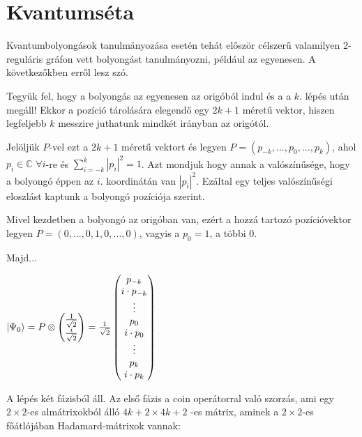 \chapter{\textbf{Kvantumséta}}

Kvantumbolyongások tanulmányozása esetén tehát először célszerű valamilyen
2-reguláris gráfon vett bolyongást tanulmányozni, például az egyenesen. A
következőkben erről lesz szó.

Tegyük fel, hogy a bolyongás az egyenesen az origóból indul és a a $k.$ lépés
után megáll! Ekkor a pozíció tárolására elegendő egy $2k+1$ méretű vektor,
hiszen legfeljebb $k$ messzire juthatunk mindkét irányban az origótól.

Jelöljük $P$-vel ezt a $2k+1$ méretű vektort és legyen
$P=(p_{-k},...,p_0,...,p_{k})$, ahol $p_i\in\mathds{C}$ $\forall i$-re és
$\sum\limits_{i=-k}^{k}|p_i|^2 = 1$. Azt mondjuk hogy annak a valószínűsége,
hogy a bolyongó éppen az $i.$ koordinátán van $|p_i|^2$. Ezáltal egy teljes
valószínűségi eloszlást kaptunk a bolyongó pozíciója szerint.

Mivel kezdetben a bolyongó az origóban van, ezért a hozzá tartozó pozícióvektor
legyen $P = (0,...,0,1,0,...,0)$, vagyis a $p_0=1$, a többi $0$.

Majd...

\begin{center}
  $\ket{\Psi_0} = P \otimes \begin{pmatrix} \frac{1}{\sqrt{2}} \\ \frac{i}{\sqrt{2}} \end{pmatrix}
    = \frac{1}{\sqrt{2}} \begin{pmatrix}
      p_{-k}         \\
      i\cdot{}p_{-k} \\
      \vdots         \\
      p_{0}          \\
      i\cdot{}p_{0}  \\
      \vdots         \\
      p_{k}          \\
      i\cdot{}p_{k}
    \end{pmatrix}
  $
\end{center}

A lépés két fázisból áll. Az első fázis a coin operátorral való szorzás, ami
egy $2 \times 2$-es almátrixokból álló $4k+2 \times 4k+2$ -es mátrix, aminek a
$2 \times 2$-es főátlójában Hadamard-mátrixok vannak:

